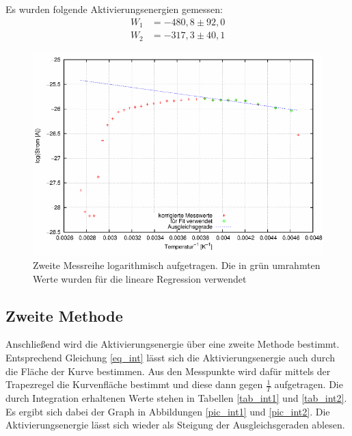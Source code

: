 Es wurden folgende Aktivierungsenergien gemessen:
\begin{align}
W_1&=-480,8 \pm 92,0\\
W_2&=-317,3 \pm 40,1
\end{align}
\begin{figure}[H]
\includegraphics[scale=0.8]{../gnu/relax22.pdf}
\caption{Zweite Messreihe logarithmisch aufgetragen. Die in grün umrahmten Werte wurden für die lineare Regression verwendet}
\label{pic_22}
\end{figure}

\subsection{Zweite Methode}
Anschließend wird die Aktivierungsenergie über eine zweite Methode bestimmt. Entsprechend Gleichung \eqref{eq_int} lässt sich die Aktivierungsenergie auch durch die Fläche der Kurve bestimmen. Aus den Messpunkte wird dafür mittels der Trapezregel die Kurvenfläche bestimmt und diese dann gegen $\frac{1}{T}$ aufgetragen. Die durch Integration erhaltenen Werte stehen in Tabellen \ref{tab_int1} und \ref{tab_int2}. Es ergibt sich dabei der Graph in Abbildungen \ref{pic_int1} und \ref{pic_int2}. Die Aktivierungsenergie lässt sich wieder als Steigung der Ausgleichsgeraden ablesen.

